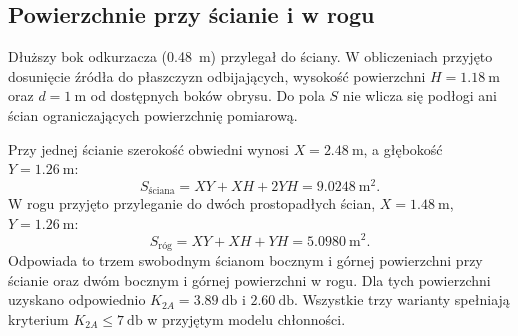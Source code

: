 \subsection{Powierzchnie przy ścianie i w rogu}
Dłuższy bok odkurzacza (\qty{0.48}{\metre}) przylegał do ściany.
W obliczeniach przyjęto dosunięcie źródła do płaszczyzn odbijających,
wysokość powierzchni $H=\qty{1.18}{\metre}$ oraz $d=\qty{1}{\metre}$
od dostępnych boków obrysu. Do pola $S$ nie wlicza się podłogi ani ścian
ograniczających powierzchnię pomiarową.

Przy jednej ścianie szerokość obwiedni wynosi
$X=\qty{2.48}{\metre}$, a głębokość $Y=\qty{1.26}{\metre}$:
\begin{equation}
S_{\text{ściana}}=XY+XH+2YH=\qty{9.0248}{\metre\squared}.
\end{equation}
W rogu przyjęto przyleganie do dwóch prostopadłych ścian,
$X=\qty{1.48}{\metre}$, $Y=\qty{1.26}{\metre}$:
\begin{equation}
S_{\text{róg}}=XY+XH+YH=\qty{5.0980}{\metre\squared}.
\end{equation}
Odpowiada to trzem swobodnym ścianom bocznym i górnej powierzchni przy
ścianie oraz dwóm bocznym i górnej powierzchni w rogu.
Dla tych powierzchni uzyskano odpowiednio $K_{2A}=\qty{3.89}{\decibel}$
i $\qty{2.60}{\decibel}$. Wszystkie trzy warianty spełniają kryterium
$K_{2A}\leq\qty{7}{\decibel}$ w przyjętym modelu chłonności.




